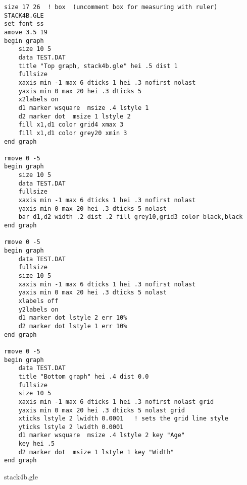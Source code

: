 \clearpage
\begin{center}
\begin{minipage}[t]{12.0cm}
{\scriptsize %
\begin{verbatim}
size 17 26  ! box  (uncomment box for measuring with ruler) STACK4B.GLE
set font ss
amove 3.5 19
begin graph
	size 10 5
	data TEST.DAT
	title "Top graph, stack4b.gle" hei .5 dist 1
	fullsize
	xaxis min -1 max 6 dticks 1 hei .3 nofirst nolast
	yaxis min 0 max 20 hei .3 dticks 5 
	x2labels on
	d1 marker wsquare  msize .4 lstyle 1
	d2 marker dot  msize 1 lstyle 2
	fill x1,d1 color grid4 xmax 3
	fill x1,d1 color grey20 xmin 3
end graph

rmove 0 -5
begin graph
	size 10 5
	data TEST.DAT
	fullsize
	xaxis min -1 max 6 dticks 1 hei .3 nofirst nolast
	yaxis min 0 max 20 hei .3 dticks 5 nolast
	bar d1,d2 width .2 dist .2 fill grey10,grid3 color black,black
end graph

rmove 0 -5
begin graph
	data TEST.DAT
	fullsize
	size 10 5
	xaxis min -1 max 6 dticks 1 hei .3 nofirst nolast
	yaxis min 0 max 20 hei .3 dticks 5 nolast
	xlabels off
	y2labels on
	d1 marker dot lstyle 2 err 10%
	d2 marker dot lstyle 1 err 10%
end graph

rmove 0 -5
begin graph
	data TEST.DAT
	title "Bottom graph" hei .4 dist 0.0
	fullsize
	size 10 5
	xaxis min -1 max 6 dticks 1 hei .3 nofirst nolast grid
	yaxis min 0 max 20 hei .3 dticks 5 nolast grid
	xticks lstyle 2 lwidth 0.0001  	! sets the grid line style
	yticks lstyle 2 lwidth 0.0001
	d1 marker wsquare  msize .4 lstyle 2 key "Age"
	key hei .5
	d2 marker dot  msize 1 lstyle 1 key "Width"
end graph
\end{verbatim}
}
\hfill {\small stack4b.gle}\\
\end{minipage}
\end{center}
\vfill
